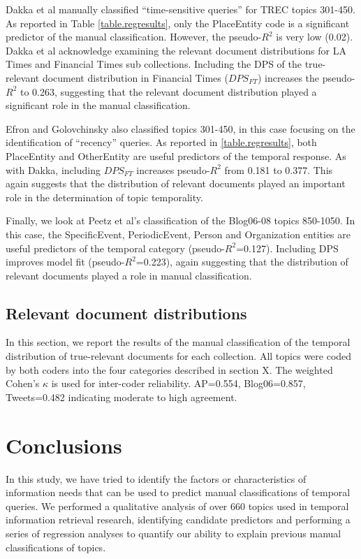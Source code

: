 \documentclass[runningheads,a4paper]{llncs}
\begin{document}
Dakka et al manually classified ``time-sensitive queries'' for TREC topics 301-450. As reported in Table \ref{table.regresults}, only the PlaceEntity code is a significant predictor of the manual classification. However, the pseudo-$R^2$ is very low (0.02).  Dakka et al acknowledge examining the relevant document distributions for LA Times and Financial Times sub collections.  Including the DPS of the true-relevant document distribution in Financial Times ($DPS_{FT}$) increases the pseudo-$R^2$ to 0.263, suggesting that the relevant document distribution played a significant role in the manual classification.

Efron and Golovchinsky also classified topics 301-450, in this case focusing on the identification of ``recency'' queries. As reported in \ref{table.regresults}, both PlaceEntity and OtherEntity are useful predictors of the temporal response. As with Dakka, including $DPS_{FT}$ increases pseudo-$R^2$ from 0.181 to 0.377. This again suggests that the distribution of relevant documents played an important role in the determination of topic temporality.

Finally, we look at Peetz et al's classification of the Blog06-08 topics 850-1050. In this case, the SpecificEvent, PeriodicEvent, Person and Organization entities are useful predictors of the temporal category (pseudo-$R^2$=0.127). Including DPS  improves model fit (pseudo-$R^2$=0.223), again suggesting that the distribution of relevant documents played a role in manual classification.

\subsection{Relevant document distributions}

In this section, we report the results of the manual classification of the temporal distribution of true-relevant documents for each collection.  All topics were coded by both coders into the four categories described in section X. The weighted Cohen's $\kappa$ is used for inter-coder reliability. AP=0.554, Blog06=0.857, Tweets=0.482  indicating moderate to high agreement.


\section{Conclusions}

In this study, we have tried to identify the factors or characteristics of information needs that can be used to predict manual classifications of temporal queries. We performed a qualitative analysis of over 660 topics used in temporal information retrieval research, identifying candidate predictors and performing a series of regression analyses to quantify our ability to explain previous manual classifications of topics. 
\end{document}
